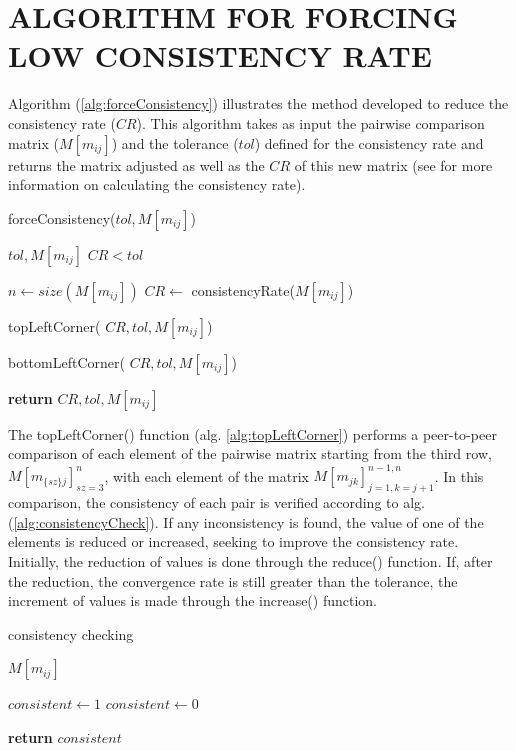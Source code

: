 \documentclass[10pt,fleqn,a4paper,twoside]{article}
\begin{document}
    \section{ALGORITHM FOR FORCING LOW CONSISTENCY RATE}
    
    Algorithm (\ref{alg:forceConsistency}) illustrates the method developed to reduce the consistency rate ($CR$). This algorithm takes as input the pairwise comparison matrix ($M[m_{ij}]$) and the tolerance ($tol$) defined for the consistency rate and returns the matrix adjusted as well as the $CR$ of this new matrix (see \cite{Saaty1987} for more information on calculating the consistency rate).
    
\begin{algorithm}
\caption{forceConsistency($tol, M[m_{ij}]$)}\label{alg:forceConsistency}
	\begin{algorithmic}
	\Require $tol, M[m_{ij}]$
	\Ensure $CR < tol$
		
	\State $n \gets size(M[m_{ij}])$
	\State $CR \gets$ consistencyRate($M[m_{ij}]$)
	
	\State topLeftCorner( $CR, tol, M[m_{ij}]$)
	
	\State bottomLeftCorner( $CR, tol, M[m_{ij}]$)
	
	\State \textbf{return} $CR, tol, M[m_{ij}]$
	
\end{algorithmic}
\end{algorithm}

The topLeftCorner() function (alg. \ref{alg:topLeftCorner}) performs a peer-to-peer comparison of each element of the pairwise matrix starting from the third row, $M[m_{\{sz\}j}]_{sz=3}^{n}$, with each element of the matrix $M[m_{jk}]_{j=1, k=j+1}^{n-1,n}$. In this comparison, the consistency of each pair is verified according to alg. (\ref{alg:consistencyCheck}). If any inconsistency is found, the value of one of the elements is reduced or increased, seeking to improve the consistency rate. Initially, the reduction of values is done through the reduce() function.  If, after the reduction, the convergence rate is still greater than the tolerance, the increment of values is made through the increase() function.

\begin{algorithm}
\caption{consistency checking}\label{alg:consistencyCheck}
	\begin{algorithmic}
	\Require $M[m_{ij}]$
	
		\State $consistent \gets 1$ 
	\Else
		\State $consistent \gets 0$ 
	\EndIf
	
	\State \textbf{return} $consistent$
	
\end{algorithmic}
\end{algorithm}
\end{document}
